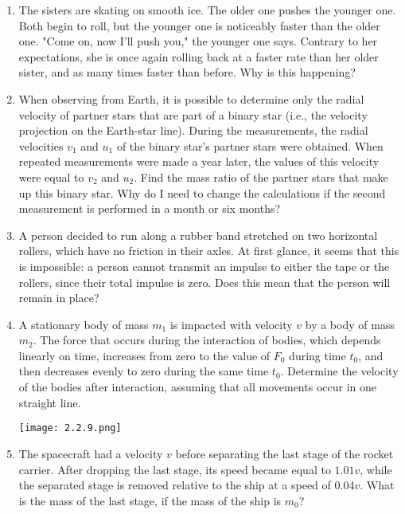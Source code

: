 \documentclass{article}
\begin{document}
\begin{enumerate}[label=2.2.\arabic*]
\item The sisters are skating on smooth ice. The older one pushes the younger one. Both begin to roll, but the younger one is noticeably faster than the older one. "Come on, now I'll push you," the younger one says. Contrary to her expectations, she is once again rolling back at a faster rate than her older sister, and as many times faster than before. Why is this happening?

\item When observing from Earth, it is possible to determine only the radial velocity of partner stars that are part of a binary star (i.e., the velocity projection on the Earth-star line). During the measurements, the radial velocities $v_1$ and $u_1$ of the binary star's partner stars were obtained. When repeated measurements were made a year later, the values of this velocity were equal to $v_2$ and $u_2$. Find the mass ratio of the partner stars that make up this binary star. Why do I need to change the calculations if the second measurement is performed in a month or six months?

\item A person decided to run along a rubber band stretched on two horizontal rollers, which have no friction in their axles. At first glance, it seems that this is impossible: a person cannot transmit an impulse to either the tape or the rollers, since their total impulse is zero. Does this mean that the person will remain in place?

\item A stationary body of mass $m_1$ is impacted with velocity $v$ by a body of mass $m_2$. The force that occurs during the interaction of bodies, which depends linearly on time, increases from zero to the value of $F_0$ during time $t_0$, and then decreases evenly to zero during the same time $t_0$. Determine the velocity of the bodies after interaction, assuming that all movements occur in one straight line.

\begin{center}
    \texttt{[image: 2.2.9.png]}
\end{center}

\item The spacecraft had a velocity $v$ before separating the last stage of the rocket carrier. After dropping the last stage, its speed became equal to $1.01 v$, while the separated stage is removed relative to the ship at a speed of $0.04 v$. What is the mass of the last stage, if the mass of the ship is $m_0$?


\end{enumerate}
\end{document}
